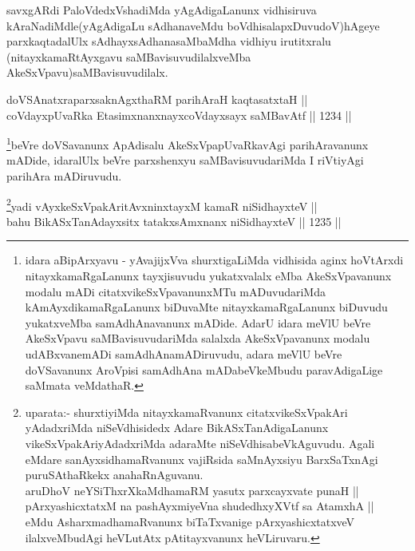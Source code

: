 \begin{artha}
savxgARdi PaloVdedxVshadiMda yAgAdigaLanunx vidhisiruva kAraNadiMdle(yAgAdigaLu sAdhanaveMdu boVdhisalapxDuvudoV)hAgeye parxkaqtadalUlx sAdhayxsAdhanasaMbaMdha vidhiyu irutitxralu (nitayxkamaRtAyxgavu saMBavisuvudilalxveMba AkeSxVpavu)saMBavisuvudilalx.
\end{artha}


\begin{shl}
doVSAnatxraparxsaknAgxthaRM parihAraH kaqtasatxtaH || \\
coVdayxpUvaRka EtasimxnanxnayxcoVdayxsayx saMBavAtf \hfill || 1234 ||   
\end{shl}

\begin{artha}
\footnote{idara aBipArxyavu - yAvajijxVva shurxtigaLiMda vidhisida aginx hoVtArxdi nitayxkamaRgaLanunx tayxjisuvudu yukatxvalalx eMba AkeSxVpavanunx modalu mADi citatxvikeSxVpavanunxMTu mADuvudariMda kAmAyxdikamaRgaLanunx biDuvaMte nitayxkamaRgaLanunx biDuvudu yukatxveMba samAdhAnavanunx mADide. AdarU idara meVlU beVre AkeSxVpavu saMBavisuvudariMda salalxda AkeSxVpavanunx modalu udABxvanemADi samAdhAnamADiruvudu, adara meVlU beVre doVSavanunx AroVpisi samAdhAna mADabeVkeMbudu  paravAdigaLige saMmata veMdathaR.}beVre doVSavanunx ApAdisalu AkeSxVpapUvaRkavAgi parihAravanunx mADide, idaralUlx beVre parxshenxyu saMBavisuvudariMda I riVtiyAgi parihAra mADiruvudu.
\end{artha}



\begin{shl}
\footnote{uparata:- shurxtiyiMda nitayxkamaRvanunx citatxvikeSxVpakAri yAdadxriMda niSeVdhisidedx Adare BikASxTanAdigaLanunx vikeSxVpakAriyAdadxriMda  adaraMte niSeVdhisabeVkAguvudu. Agali eMdare sanAyxsidhamaRvanunx vajiRsida saMnAyxsiyu BarxSaTxnAgi puruSAthaRkekx anahaRnAguvanu.\\
aruDhoV neYSiThxrXkaMdhamaRM yasutx parxcayxvate punaH ||\\
pArxyashicxtatxM na pashAyxmiyeVna shudedhxyXVtf sa AtamxhA ||\\
eMdu AsharxmadhamaRvanunx biTaTxvanige pArxyashicxtatxveV ilalxveMbudAgi heVLutAtx pAtitayxvanunx heVLiruvaru.}yadi vAyxkeSxVpakAritAvxninxtayxM kamaR niSidhayxteV || \\
bahu BikASxTanAdayxsitx tatakxsAmxnanx niSidhayxteV \hfill || 1235 ||  
\end{shl}

